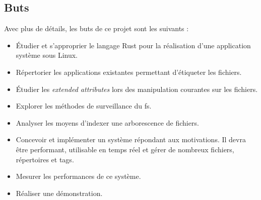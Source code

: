 \subsection{Buts}
Avec plus de détails, les buts de ce projet sont les suivants :
\begin{itemize}
    \item Étudier et s'approprier le langage Rust pour la réalisation d'une application système sous Linux.
    \item Répertorier les applications existantes permettant d'étiqueter les fichiers.
    \item Étudier les \textit{extended attributes} lors des manipulation courantes sur les fichiers.
    \item Explorer les méthodes de surveillance du \acrshort{fs}.
    \item Analyser les moyens d'indexer une arborescence de fichiers.
    \item Concevoir et implémenter un système répondant aux motivations. Il devra être performant, 
        utilisable en temps réel et gérer de nombreux fichiers, répertoires et tags.
    \item Mesurer les performances de ce système.
    \item Réaliser une démonstration.
\end{itemize}
